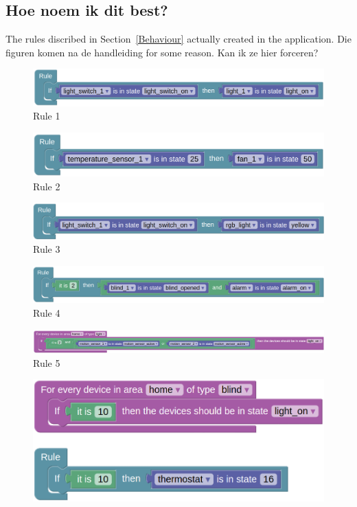 \documentclass[11pt,a4paper]{report}
\begin{document}
\begin{idplisting}
\section{Hoe noem ik dit best?}
\label{appendix:waaaaaaaaaaaaaaaat}
The rules discribed in Section~\ref{Behaviour} actually created in the application.
Die figuren komen na de handleiding for some reason. Kan ik ze hier forceren?
\begin{figure}
    \centering
    \includegraphics[width=0.8\linewidth]{images/R1.png}
    \caption{Rule 1}
\end{figure}
\begin{figure}
    \centering
    \includegraphics[width=0.8\linewidth]{images/R2.png}
    \caption{Rule 2}
\end{figure}
\begin{figure}
    \centering
    \includegraphics[width=0.8\linewidth]{images/R3.png}
    \caption{Rule 3}
\end{figure}
\begin{figure}
    \centering
    \includegraphics[width=0.8\linewidth]{images/R4.png}
    \caption{Rule 4}
\end{figure}
\begin{figure}
    \centering
    \includegraphics[width=0.8\linewidth]{images/R5.png}
    \caption{Rule 5}
\end{figure}
\begin{figure}
    \centering
    \includegraphics[width=0.8\linewidth]{images/R6.png}

\end{figure}
\end{idplisting}
\end{document}
